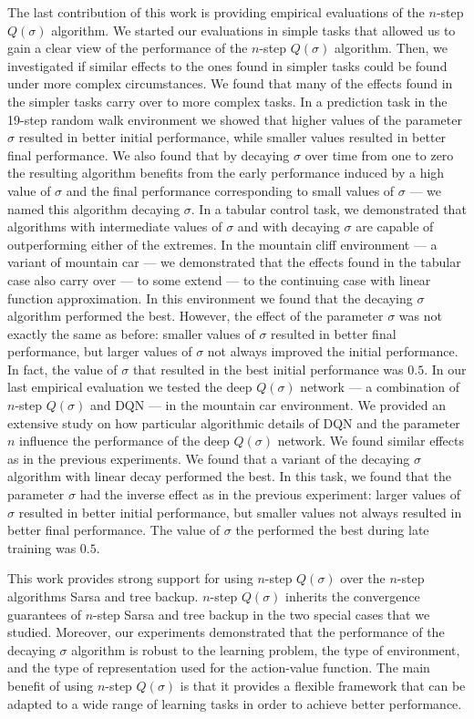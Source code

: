 The last contribution of this work is providing empirical evaluations of the $n$-step $Q(\sigma)$ algorithm.
We started our evaluations in simple tasks that allowed us to gain a clear view of the performance of the $n$-step $Q(\sigma)$ algorithm.
Then, we investigated if similar effects to the ones found in simpler tasks could be found under more complex circumstances.
We found that many of the effects found in the simpler tasks carry over to more complex tasks.
In a prediction task in the 19-step random walk environment we showed that higher values of the parameter $\sigma$ resulted in better initial performance, while smaller values resulted in better final performance.
We also found that by decaying $\sigma$ over time from one to zero the resulting algorithm benefits from the early performance induced by a high value of $\sigma$ and the final performance corresponding to small values of $\sigma$ --- we named this algorithm decaying $\sigma$.
In a tabular control task, we demonstrated that algorithms with intermediate values of $\sigma$ and with decaying $\sigma$ are capable of outperforming either of the extremes.
In the mountain cliff environment --- a variant of mountain car --- we demonstrated that the effects found in the tabular case also carry over --- to some extend --- to the continuing case with linear function approximation.
In this environment we found that the decaying $\sigma$ algorithm performed the best.
However, the effect of the parameter $\sigma$ was not exactly the same as before: smaller values of $\sigma$ resulted in better final performance, but larger values of $\sigma$ not always improved the initial performance.
In fact, the value of $\sigma$ that resulted in the best initial performance was $0.5$. 
In our last empirical evaluation we tested the deep $Q(\sigma)$ network --- a combination of $n$-step $Q(\sigma)$ and DQN --- in the mountain car environment.
We provided an extensive study on how particular algorithmic details of DQN and the parameter $n$ influence the performance of the deep $Q(\sigma)$ network.
We found similar effects as in the previous experiments.
We found that a variant of the decaying $\sigma$ algorithm with linear decay performed the best.
In this task, we found that the parameter $\sigma$ had the inverse effect as in the previous experiment: larger values of $\sigma$ resulted in better initial performance, but smaller values not always resulted in better final performance.
The value of $\sigma$ the performed the best during late training was $0.5$.

This work provides strong support for using $n$-step $Q(\sigma)$ over the $n$-step algorithms Sarsa and tree backup.
$n$-step $Q(\sigma)$ inherits the convergence guarantees of $n$-step Sarsa and tree backup in the two special cases that we studied.
Moreover, our experiments demonstrated that the performance of the decaying $\sigma$ algorithm is robust to the learning problem, the type of environment, and the type of representation used for the action-value function.
The main benefit of using $n$-step $Q(\sigma)$ is that it provides a flexible framework that can be adapted to a wide range of learning tasks in order to achieve better performance.


